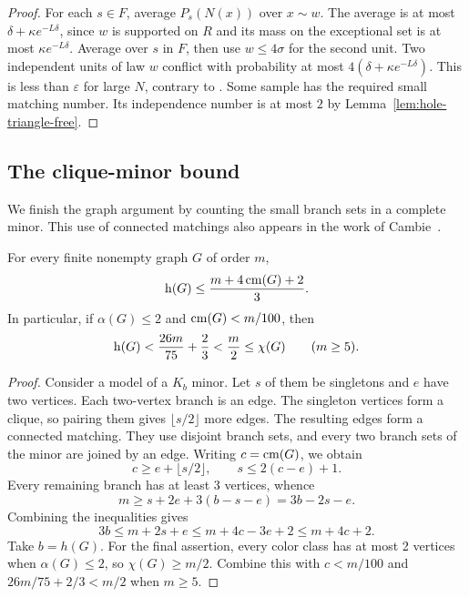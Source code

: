 \begin{proof}
For each \(s\in F\), average \(P_s(N(x))\) over \(x\sim w\).
The average is at most \(\delta+\kappa e^{-L\delta}\), since \(w\)
is supported on \(R\) and its mass on the exceptional set is at most
\(\kappa e^{-L\delta}\). Average over \(s\) in \(F\), then use
\(w\le4\sigma\) for the second unit. Two independent units of law \(w\)
conflict with probability at most \(4(\delta+\kappa e^{-L\delta})\).
This is less than \(\varepsilon\) for large \(N\), contrary to
. Some sample has the required small
matching number. Its independence number is at most \(2\) by
Lemma~\ref{lem:hole-triangle-free}.
\end{proof}

\subsection{The clique-minor bound}

We finish the graph argument by counting the small branch sets in a
complete minor. This use of connected matchings also appears in the
work of Cambie~\citep{cambie2021}.

\begin{proposition}\label{prop:matching-minor}
For every finite nonempty graph \(G\) of order \(m\),
\[
 \operatorname{h}(G)\le\frac{m+4\operatorname{cm}(G)+2}{3}.
\]
In particular, if \(\alpha(G)\le2\) and \(\operatorname{cm}(G)<m/100\), then
\[
 \operatorname{h}(G)<\frac{26m}{75}+\frac23<\frac m2\le\chi(G)
 \qquad(m\ge5).
\]
\end{proposition}
\begin{proof}
Consider a model of a \(K_b\) minor.
Let \(s\) of them be singletons and \(e\) have two vertices.
Each two-vertex branch is an edge.
The singleton vertices form a clique, so pairing them gives \(\lfloor s/2\rfloor\) more edges.
The resulting edges form a connected matching. They use disjoint
branch sets, and every two branch sets of the minor are joined by an edge.
Writing \(c=\operatorname{cm}(G)\), we obtain
\[
 c\ge e+\lfloor s/2\rfloor,\qquad s\le2(c-e)+1.
\]
Every remaining branch has at least 3 vertices, whence
\[
 m\ge s+2e+3(b-s-e)=3b-2s-e.
\]
Combining the inequalities gives
\[
 3b\le m+2s+e\le m+4c-3e+2\le m+4c+2.
\]
Take \(b=h(G)\).
For the final assertion, every color class has at most 2 vertices when \(\alpha(G)\le2\), so \(\chi(G)\ge m/2\).
Combine this with \(c<m/100\) and \(26m/75+2/3<m/2\) when \(m\ge5\).
\end{proof}
